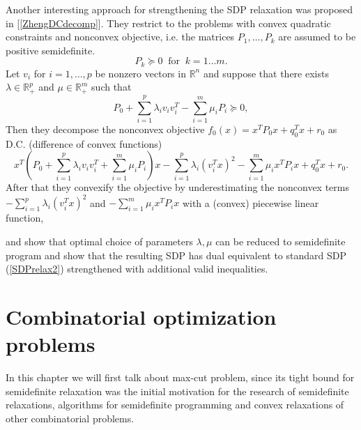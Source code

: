 \documentclass[12pt]{book}
\theoremstyle{definition}
\begin{document}
Another interesting approach for strengthening the SDP relaxation was proposed in [\ref{ZhengDCdecomp}]. 
They restrict to the problems with convex quadratic constraints and nonconvex objective, i.e. the matrices $P_1,\dots, P_k$ are assumed to be positive semidefinite. 
\begin{equation}
P_k\succeq 0 \ \mbox{ for }\  k = 1\dots m. 
\end{equation} 
Let $v_i$ for $i=1,\dots ,p$ be nonzero vectors in $\mathbb{R}^n$ and suppose that there exists $\lambda \in \mathbb{R}^p_+$ and $\mu \in \mathbb{R}^m_+$ such that 
\begin{equation}
P_0 + \sum_{i = 1}^p\lambda_i v_iv_i^T  - \sum_{i = 1}^m \mu_i P_i \succeq 0,
\end{equation}
Then they decompose the nonconvex objective $f_0(x) = x^TP_0x + q_0^Tx + r_0 $ as D.C. (difference of convex functions) 
\begin{equation}
x^T\left( P_0 + \sum_{i = 1}^p\lambda_i v_iv_i^T  + \sum_{i = 1}^m \mu_i P_i\right)x  - \sum_{i = 1}^p\lambda_i (v_i^Tx)^2  - \sum_{i = 1}^m \mu_i x^TP_ix + q_0^Tx + r_0.
\end{equation}
After that they convexify the objective by underestimating the nonconvex terms $-\sum_{i = 1}^p\lambda_i (v_i^Tx)^2$ and  $ - \sum_{i = 1}^m \mu_i x^TP_ix$ with a (convex) piecewise linear function, 


and show that optimal choice of parameters $\lambda, \mu$ can be reduced to semidefinite program and show that the resulting SDP has dual equivalent to 
standard SDP (\ref{SDPrelax2}) strengthened with additional valid inequalities.






\chapter{Combinatorial optimization problems}

In this chapter we will first talk about max-cut problem, since its tight bound for semidefinite relaxation was the initial motivation for the research of semidefinite relaxations, algorithms for semidefinite programming and convex relaxations of other combinatorial problems.
\end{document}
